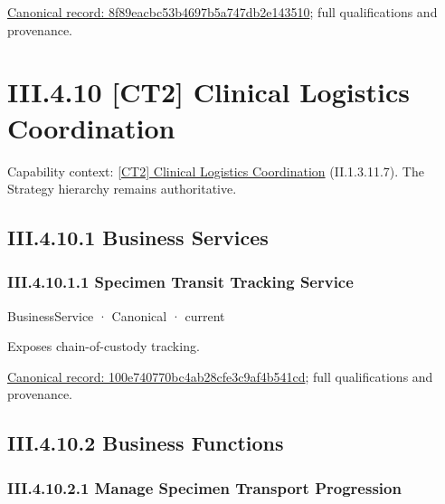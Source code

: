 {\footnotesize \href{../../../../continuum/business/business-function/8f89eacbc53b4697b5a747db2e143510.md}{Canonical record: 8f89eacbc53b4697b5a747db2e143510}; full qualifications and provenance.}\par
\section*{III.4.10 [CT2] Clinical Logistics Coordination}
\label{navigation:III.4.10}

{\small Capability context: \hyperref[element:0c27be11b4a44cb19e992309b8146a17]{[CT2] Clinical Logistics Coordination} (II.1.3.11.7). The Strategy hierarchy remains authoritative.}\par
\subsection*{III.4.10.1 Business Services}
\label{navigation:III.4.10.1}

\subsubsection*{III.4.10.1.1 Specimen Transit Tracking Service}
\label{navigation:III.4.10.1.1}

\label{element:100e740770bc4ab28cfe3c9af4b541cd}
{\small BusinessService · Canonical · current}\par

Exposes chain-of-custody tracking.


{\footnotesize \href{../../../../continuum/business/business-service/100e740770bc4ab28cfe3c9af4b541cd.md}{Canonical record: 100e740770bc4ab28cfe3c9af4b541cd}; full qualifications and provenance.}\par
\subsection*{III.4.10.2 Business Functions}
\label{navigation:III.4.10.2}

\subsubsection*{III.4.10.2.1 Manage Specimen Transport Progression}
\label{navigation:III.4.10.2.1}

